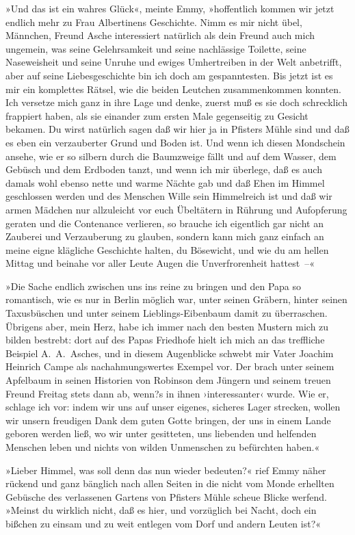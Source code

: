 »Und das ist ein wahres Glück«, meinte Emmy, »hoffentlich kommen
wir jetzt endlich mehr zu Frau Albertinens Geschichte. Nimm es mir
nicht übel, Männchen, Freund Asche interessiert natürlich als dein
Freund auch mich ungemein, was seine Gelehrsamkeit und seine
nachlässige Toilette, seine Naseweisheit und seine Unruhe und
ewiges Umhertreiben in der Welt anbetrifft, aber auf seine
Liebesgeschichte bin ich doch am gespanntesten. Bis jetzt ist es
mir ein komplettes Rätsel, wie die beiden Leutchen zusammenkommen
konnten. Ich versetze mich ganz in ihre Lage und denke, zuerst muß
es sie doch schrecklich frappiert haben, als sie einander zum
ersten Male gegenseitig zu Gesicht bekamen. Du wirst natürlich
sagen daß wir hier ja in Pfisters Mühle sind und daß es eben ein
verzauberter Grund und Boden ist. Und wenn ich diesen Mondschein
ansehe, wie er so silbern durch die Baumzweige fällt und auf dem
Wasser, dem Gebüsch und dem Erdboden tanzt, und wenn ich mir
überlege, daß es auch damals wohl ebenso nette und warme Nächte gab
und daß Ehen im Himmel geschlossen werden und des Menschen Wille
sein Himmelreich ist und daß wir armen Mädchen nur allzuleicht vor
euch Übeltätern in Rührung und Aufopferung geraten und die
Contenance verlieren, so brauche ich eigentlich gar nicht an
Zauberei und Verzauberung zu glauben, sondern kann mich ganz
einfach an meine eigne klägliche Geschichte halten, du Bösewicht,
und wie du am hellen Mittag und beinahe vor aller Leute Augen die
Unverfrorenheit hattest~–«

»Die Sache endlich zwischen uns ins reine zu bringen und den Papa
so romantisch, wie es nur in Berlin möglich war, unter seinen
Gräbern, hinter seinen Taxusbüschen und unter seinem
Lieblings-Eibenbaum damit zu überraschen. Übrigens aber, mein Herz,
habe ich immer nach den besten Mustern mich zu bilden bestrebt:
dort auf des Papas Friedhofe hielt ich mich an das treffliche
Beispiel A.~A.~Asches, und in diesem Augenblicke schwebt mir Vater
Joachim Heinrich Campe als nachahmungswertes Exempel vor. Der brach
unter seinem Apfelbaum in seinen Historien von Robinson dem Jüngern
und seinem treuen Freund Freitag stets dann ab, wenn?s in ihnen
›interessanter‹ wurde. Wie er, schlage ich vor: indem wir uns auf
unser eigenes, sicheres Lager strecken, wollen wir unsern freudigen
Dank dem guten Gotte bringen, der uns in einem Lande geboren werden
ließ, wo wir unter gesitteten, uns liebenden und helfenden Menschen
leben und nichts von wilden Unmenschen zu befürchten haben.«

»Lieber Himmel, was soll denn das nun wieder bedeuten?« rief Emmy
näher rückend und ganz bänglich nach allen Seiten in die nicht vom
Monde erhellten Gebüsche des verlassenen Gartens von Pfisters Mühle
scheue Blicke werfend. »Meinst du wirklich nicht, daß es hier, und
vorzüglich bei Nacht, doch ein bißchen zu einsam und zu weit
entlegen vom Dorf und andern Leuten ist?«

